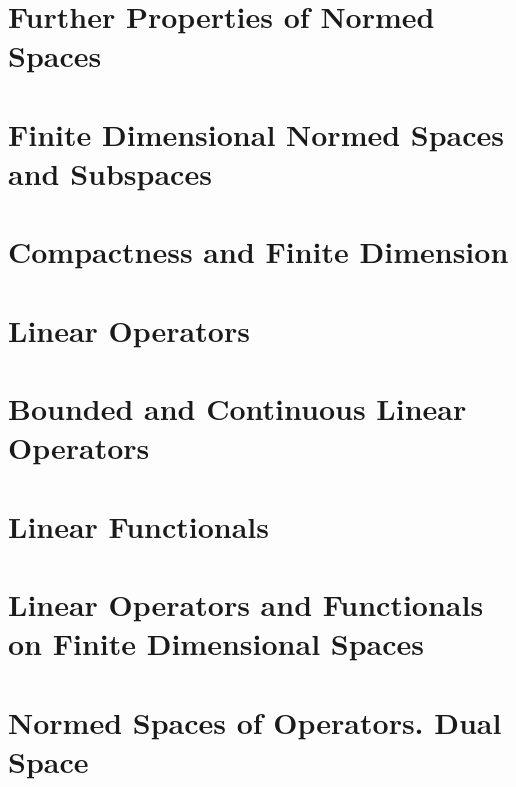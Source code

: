 \section{Further Properties of Normed Spaces}

\section{Finite Dimensional Normed Spaces and Subspaces}

\section{Compactness and Finite Dimension}

\section{Linear Operators}

\section{Bounded and Continuous Linear Operators}

\section{Linear Functionals}

\section{Linear Operators and Functionals on Finite Dimensional Spaces}

\section{Normed Spaces of Operators. Dual Space}

